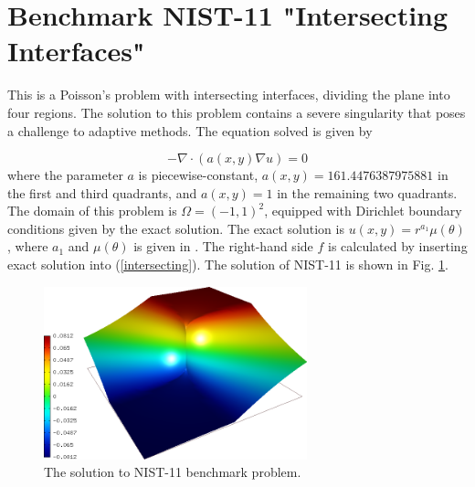 \documentclass[12pt]{elsarticle}
\begin{document}

\section{Benchmark NIST-11 "Intersecting Interfaces"}
\label{sec:bench-11}

This is a Poisson's problem with intersecting interfaces,
dividing the plane into four regions.
The solution to this problem contains a severe
singularity that poses a challenge to adaptive methods.
The equation solved is given by

\begin{equation} \label{intersecting}
-\nabla \cdot (a(x,y) \nabla u) = 0
\end{equation}
where the parameter $a$ is piecewise-constant,
$a(x,y) = 161.4476387975881$ in the first and third quadrants,
and $a(x,y) = 1$ in the remaining two quadrants.
The domain of this problem is $\Omega = (-1, 1)^2$, equipped with
Dirichlet boundary conditions given by the exact solution.
The exact solution is
$u(x,y) = r^{a_1} \mu (\theta)$,
where $a_1$ and $\mu (\theta)$ is given in \cite{mitchell-1}.
The right-hand side $f$ is calculated by inserting exact solution into (\ref{intersecting}).
The solution of NIST-11 is shown in Fig. \ref{fig:sln-nist11}.

\begin{figure}[!ht]
\centering
\includegraphics[height=5cm]{nist/nist-11/solution.png}
\caption{The solution to NIST-11 benchmark problem.}
\label{fig:sln-nist11}
\end{figure}
\end{document}

